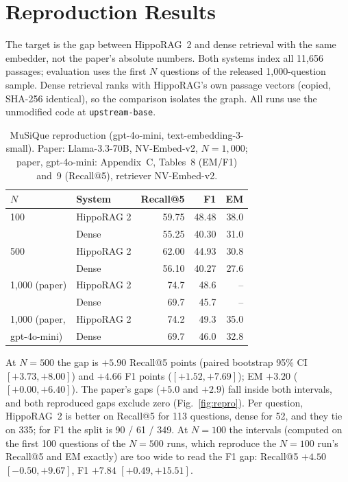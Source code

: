 \section{Reproduction Results}\label{sec:repro}

The target is the gap between HippoRAG~2 and dense retrieval with the same embedder, not the paper's absolute numbers.
Both systems index all 11,656 passages; evaluation uses the first $N$ questions of the released 1,000-question sample.
Dense retrieval ranks with HippoRAG's own passage vectors (copied, SHA-256 identical), so the comparison isolates the
graph. All runs use the unmodified code at \texttt{upstream-base}.

\begin{table}[t]
\centering
\caption{MuSiQue reproduction (gpt-4o-mini, text-embedding-3-small). Paper: Llama-3.3-70B, NV-Embed-v2, $N = 1{,}000$;
paper, gpt-4o-mini: Appendix~C, Tables~8 (EM/F1) and~9 (Recall@5), retriever NV-Embed-v2.}
\label{tab:repro}
\begin{tabular}{llrrr}
\toprule
$N$ & System & Recall@5 & F1 & EM \\
\midrule
100 & HippoRAG 2 & 59.75 & 48.48 & 38.0 \\
    & Dense      & 55.25 & 40.30 & 31.0 \\
500 & HippoRAG 2 & 62.00 & 44.93 & 30.8 \\
    & Dense      & 56.10 & 40.27 & 27.6 \\
\midrule
1,000 (paper) & HippoRAG 2 & 74.7 & 48.6 & -- \\
              & Dense      & 69.7 & 45.7 & -- \\
\midrule
1,000 (paper, & HippoRAG 2 & 74.2 & 49.3 & 35.0 \\
gpt-4o-mini)  & Dense      & 69.7 & 46.0 & 32.8 \\
\bottomrule
\end{tabular}
\end{table}

At $N = 500$ the gap is $+5.90$ Recall@5 points (paired bootstrap 95\% CI $[+3.73, +8.00]$) and $+4.66$ F1 points
($[+1.52, +7.69]$); EM $+3.20$ ($[+0.00, +6.40]$). The paper's gaps ($+5.0$ and $+2.9$) fall inside both intervals,
and both reproduced gaps exclude zero (Fig.~\ref{fig:repro}). Per question, HippoRAG~2 is better on Recall@5 for 113
questions, dense for 52, and they tie on 335; for F1 the split is 90 / 61 / 349. At $N = 100$ the intervals (computed on
the first 100 questions of the $N = 500$ runs, which reproduce the $N = 100$ run's Recall@5 and EM exactly) are too
wide to read the F1 gap: Recall@5 $+4.50$ $[-0.50, +9.67]$, F1 $+7.84$ $[+0.49, +15.51]$.

